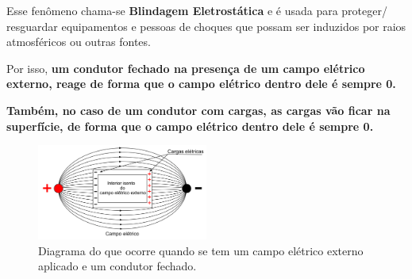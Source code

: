 \documentclass[12pt]{extarticle}
\newcommand{\<}{\langle}
\renewcommand{\>}{\rangle}
\theoremstyle{definition}
\begin{document}
Esse fenômeno chama-se \textbf{Blindagem Eletrostática} e é usada para proteger/ resguardar equipamentos e pessoas de choques que possam ser induzidos por raios atmosféricos ou outras fontes.

Por isso, \textbf{um condutor fechado na presença de um campo elétrico externo, reage de forma que o campo elétrico dentro dele é sempre 0.}

\textbf{Também, no caso de um condutor com cargas, as cargas vão ficar na superfície, de forma que o campo elétrico dentro dele é sempre 0.}

\begin{figure}[H]
    \centering
    \includegraphics[width=0.5\textwidth]{campo-eletrico.png}
    \caption{Diagrama do que ocorre quando se tem um campo elétrico externo aplicado e um condutor fechado.}
    \label{fig:conductor}
\end{figure}
\end{document}
